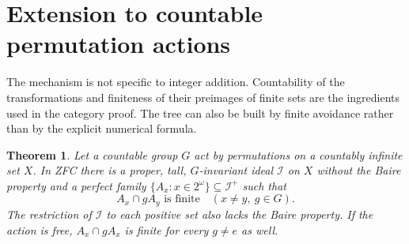 \documentclass[11pt,a4paper]{article}
\newtheorem{theorem}{Theorem}[section]
\theoremstyle{definition}
\theoremstyle{remark}
\newcommand{\I}{\mathcal I}
\begin{document}
\section{Extension to countable permutation actions}
\label{sec:group}

The mechanism is not specific to integer addition. Countability of the
transformations and finiteness of their preimages of finite sets are
the ingredients used in the category proof. The tree can also be built
by finite avoidance rather than by the explicit numerical formula.

\begin{theorem}
\label{thm:group}
Let a countable group $G$ act by permutations on a countably infinite
set $X$. In ZFC there is a proper, tall, $G$-invariant ideal $\I$ on $X$
without the Baire property and a perfect family
$\{A_x:x\in2^\omega\}\subseteq\I^+$ such that
\[
                         A_x\cap gA_y\text{ is finite}
               \quad(x\ne y,\ g\in G).
\]
The restriction of $\I$ to each positive set also lacks the Baire
property. If the action is free, $A_x\cap gA_x$ is finite for every
$g\ne e$ as well.
\end{theorem}
\end{document}

